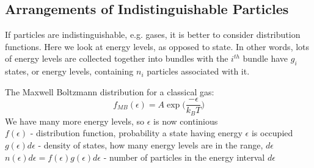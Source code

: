 \documentclass[a4paper, 11pt, normalem]{report}
\begin{document}
\subsection{Arrangements of Indistinguishable Particles}
If particles are indistinguishable, e.g. gases, it is better to consider distribution functions.
Here we look at energy levels, as opposed to state.
In other words, lots of energy levels are collected together into bundles with the $i^{th}$ bundle have $g_i$ states, or energy levels, containing $n_i$ particles associated with it.

The Maxwell Boltzmann distribution for a classical gas:
\begin{equation*}
    f_{MB}(\epsilon) = A\exp\Big(\frac{-\epsilon}{k_B T}\Big)
\end{equation*}
We have many more energy levels, so $\epsilon$ is now continious \\
$f(\epsilon)$ - distribution function, probability a state having energy $\epsilon$ is occupied \\
$g(\epsilon)d\epsilon$ - density of states, how many energy levels are in the range, $d\epsilon$ \\
$n(\epsilon)d\epsilon = f(\epsilon)g(\epsilon)d\epsilon$ - number of particles in the energy interval $d\epsilon$
\end{document}
